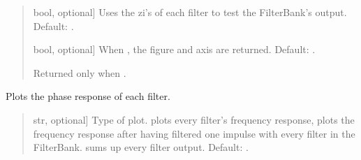 \documentclass[letterpaper,10pt,english]{sphinxmanual}
\begin{document}
\begin{fulllineitems}
\begin{fulllineitems}
\begin{quote}
\begin{description}
\begin{description}
\sphinxlineitem{\sphinxstylestrong{test\_zi}}{[}bool, optional{]}
\sphinxAtStartPar
Uses the zi’s of each filter to test the FilterBank’s output.
Default: .

\sphinxlineitem{\sphinxstylestrong{returns}}{[}bool, optional{]}
\sphinxAtStartPar
When , the figure and axis are returned. Default: .

\end{description}

\begin{description}
\sphinxAtStartPar
Returned only when .

\end{description}

\end{description}\end{quote}

\end{fulllineitems}


\begin{fulllineitems}
\label{\detokenize{classes:dsptools.classes.filterbank.FilterBank.plot_phase}}
\pysigstartsignatures
{}
\pysigstopsignatures
\sphinxAtStartPar
Plots the phase response of each filter.
\begin{quote}\begin{description}
\begin{description}
\sphinxlineitem{\sphinxstylestrong{mode}}{[}str, optional{]}
\sphinxAtStartPar
Type of plot.  plots every filter’s frequency response,
 plots the frequency response after having filtered
one impulse with every filter in the FilterBank. 
sums up every filter output. Default: .


\end{description}
\end{description}
\end{quote}
\end{fulllineitems}
\end{fulllineitems}
\end{document}

